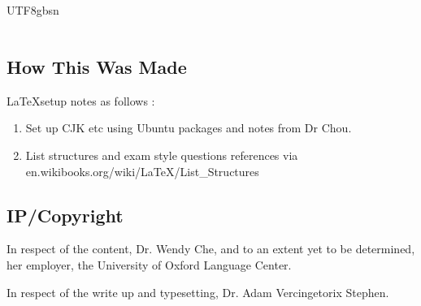 \documentclass{article}
\newcommand{\myfont}{gbsn} %
\begin{document}
\begin{CJK}{UTF8}{\myfont}
\begin{tabular}{|l|l|l|l|l|}
    \end{tabular}

    
\subsection{How This Was Made}

\LaTeX setup notes as follows :

\begin{enumerate}
\item Set up CJK etc using Ubuntu packages and notes from Dr Chou.
\item List structures and exam style questions references via en.wikibooks.org/wiki/LaTeX/List\_Structures
\end{enumerate}

\subsection{IP/Copyright}

In respect of the content, Dr. Wendy Che, and to an extent yet to be determined, her employer, the University of Oxford Language Center.

In respect of the write up and typesetting, Dr. Adam Vercingetorix Stephen.


\end{CJK} 
\end{document}
